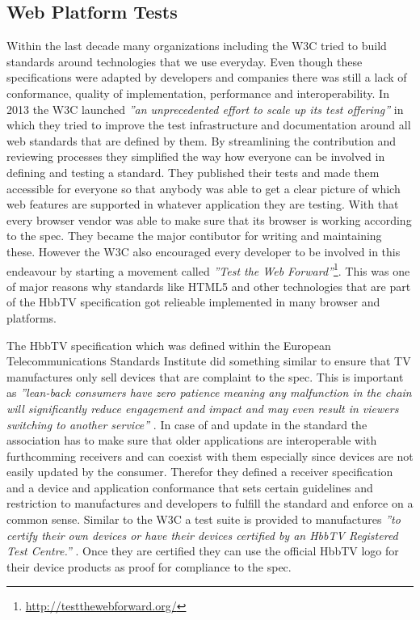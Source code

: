 \subsection{Web Platform Tests}

Within the last decade many organizations including the W3C tried to build standards around
technologies that we use everyday. Even though these specifications were adapted by developers
and companies there was still a lack of conformance, quality of implementation, performance
and interoperability. In 2013 the W3C launched \textit{''an unprecedented effort to scale up
its test offering''} \cite{w3ctesting} in which they tried to improve the test infrastructure
and documentation around all web standards that are defined by them. By streamlining the
contribution and reviewing processes they simplified the way how everyone can be involved in
defining and testing a standard. They published their tests and made them accessible for everyone
so that anybody was able to get a clear picture of which web features are supported in whatever
application they are testing. With that every browser vendor was able to make sure that its
browser is working according to the spec. They became the major contibutor for writing and
maintaining these. However the W3C also encouraged every developer to be involved in this
endeavour by starting a movement called \textit{''Test the Web Forward''}\footnote{\url{http://testthewebforward.org/}}.
This was one of major reasons why standards like HTML5 and other technologies that are part
of the HbbTV specification got relieable implemented in many browser and platforms.

The HbbTV specification which was defined within the European Telecommunications Standards
Institute did something similar to ensure that TV manufactures only sell devices that are
complaint to the spec. This is important as \textit{''lean-back consumers have zero patience
meaning any malfunction in the chain will significantly reduce engagement and impact and
may even result in viewers switching to another service''} \cite{hbbtvtesting}. In case of
and update in the standard the association has to make sure that older applications are
interoperable with furthcomming receivers and can coexist with them especially since devices
are not easily updated by the consumer. Therefor they defined a receiver specification and
a device and application conformance that sets certain guidelines and restriction to manufactures
and developers to fulfill the standard and enforce on a common sense. Similar to the W3C a
test suite is provided to manufactures \textit{''to certify their own devices or have their
devices certified by an HbbTV Registered Test Centre.''} \cite{hbbtvtesting}. Once they are
certified they can use the official HbbTV logo for their device products as proof for compliance
to the spec.

